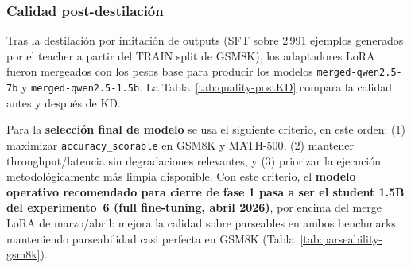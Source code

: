 \documentclass[11pt,a4paper]{article}
\begin{document}
\subsubsection*{Calidad post-destilaci\'on}

Tras la destilaci\'on por imitaci\'on de outputs (SFT sobre 2\,991 ejemplos
generados por el teacher a partir del TRAIN split de GSM8K), los adaptadores
LoRA fueron mergeados con los pesos base para producir los modelos
\texttt{merged-qwen2.5-7b} y \texttt{merged-qwen2.5-1.5b}. La
Tabla~\ref{tab:quality-postKD} compara la calidad antes y despu\'es de KD.

Para la \textbf{selecci\'on final de modelo} se usa el siguiente criterio,
en este orden: (1) maximizar \texttt{accuracy\_scorable} en GSM8K y MATH-500,
(2) mantener throughput/latencia sin degradaciones relevantes, y
(3) priorizar la ejecuci\'on metodol\'ogicamente m\'as limpia disponible.
Con este criterio, el \textbf{modelo operativo recomendado para cierre de
fase 1 pasa a ser el student 1.5B del experimento~6 (full fine-tuning,
abril 2026)}, por encima del merge LoRA de marzo/abril: mejora la
calidad sobre parseables en ambos benchmarks manteniendo parseabilidad
casi perfecta en GSM8K (Tabla~\ref{tab:parseability-gsm8k}).
\end{document}
